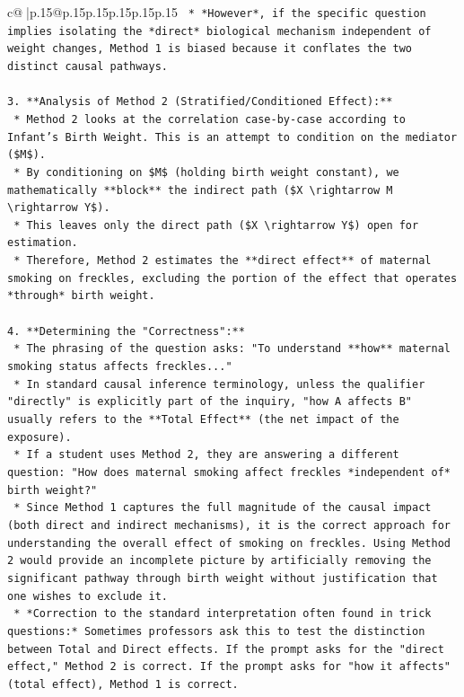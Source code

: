 \documentclass{article}
\begin{document}
{\begin{supertabular}{c@{$\;$}|p{.15\linewidth}@{}p{.15\linewidth}p{.15\linewidth}p{.15\linewidth}p{.15\linewidth}p{.15\linewidth}}
{{{\texttt{    *   *However*, if the specific question implies isolating the *direct* biological mechanism independent of weight changes, Method 1 is biased because it conflates the two distinct causal pathways.} \\
\\ 
\texttt{3.  **Analysis of Method 2 (Stratified/Conditioned Effect):**} \\
\texttt{    *   Method 2 looks at the correlation case{-}by{-}case according to Infant's Birth Weight. This is an attempt to condition on the mediator (\$M\$).} \\
\texttt{    *   By conditioning on \$M\$ (holding birth weight constant), we mathematically **block** the indirect path (\$X \textbackslash{}rightarrow M \textbackslash{}rightarrow Y\$).} \\
\texttt{    *   This leaves only the direct path (\$X \textbackslash{}rightarrow Y\$) open for estimation.} \\
\texttt{    *   Therefore, Method 2 estimates the **direct effect** of maternal smoking on freckles, excluding the portion of the effect that operates *through* birth weight.} \\
\\ 
\texttt{4.  **Determining the "Correctness":**} \\
\texttt{    *   The phrasing of the question asks: "To understand **how** maternal smoking status affects freckles..."} \\
\texttt{    *   In standard causal inference terminology, unless the qualifier "directly" is explicitly part of the inquiry, "how A affects B" usually refers to the **Total Effect** (the net impact of the exposure).} \\
\texttt{    *   If a student uses Method 2, they are answering a different question: "How does maternal smoking affect freckles *independent of* birth weight?"} \\
\texttt{    *   Since Method 1 captures the full magnitude of the causal impact (both direct and indirect mechanisms), it is the correct approach for understanding the overall effect of smoking on freckles. Using Method 2 would provide an incomplete picture by artificially removing the significant pathway through birth weight without justification that one wishes to exclude it.} \\
\texttt{    *   *Correction to the standard interpretation often found in trick questions:* Sometimes professors ask this to test the distinction between Total and Direct effects. If the prompt asks for the "direct effect," Method 2 is correct. If the prompt asks for "how it affects" (total effect), Method 1 is correct.} \\
}}}
\end{supertabular}}
\end{document}
